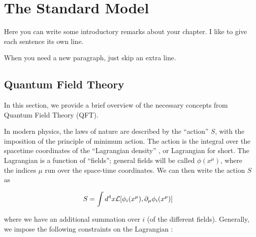 

\chapter[The Standard Model][Top of Page Title]{The Standard Model}

Here you can write some introductory remarks about your chapter.
I like to give each sentence its own line.

When you need a new paragraph, just skip an extra line.

\section{Quantum Field Theory}


In this section, we provide a brief overview of the necessary concepts from Quantum Field Theory (QFT).

In modern physics, the laws of nature are described by the ``action'' $S$, with the imposition of the principle of minimum action. 
The action is the integral over the spacetime coordinates of the ``Lagrangian density'' \Lagr, or Lagrangian for short.
The Lagrangian is a function of ``fields''; general fields will be called $\phi(x^\mu)$, where the indices $\mu$ run over the space-time coordinates.
We can then write the action $S$ as

\begin{equation}
S = \int d^4 x \mathcal{L}[ \phi_i(x^\mu) , \partial_\mu \phi_i(x^\mu)]
\end{equation}

where we have an additional summation over $i$ (of the different fields).
Generally, we impose the following constraints on the Lagrangian :

